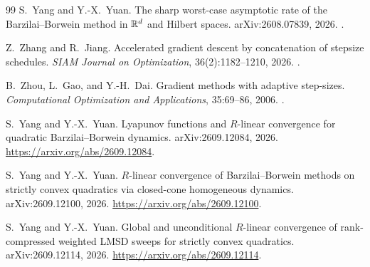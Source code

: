 \begin{thebibliography}{99}
S.~Yang and Y.-X.~Yuan.
The sharp worst-case asymptotic rate of the Barzilai--Borwein method in
$\mathbb R^d$ and Hilbert spaces.
arXiv:2608.07839, 2026.
.

Z.~Zhang and R.~Jiang.
Accelerated gradient descent by concatenation of stepsize schedules.
\emph{SIAM Journal on Optimization}, 36(2):1182--1210, 2026.
.

B.~Zhou, L.~Gao, and Y.-H.~Dai.
Gradient methods with adaptive step-sizes.
\emph{Computational Optimization and Applications}, 35:69--86, 2006.
.

S.~Yang and Y.-X.~Yuan.
Lyapunov functions and $R$-linear convergence for quadratic
Barzilai--Borwein dynamics.
arXiv:2609.12084, 2026.
\url{https://arxiv.org/abs/2609.12084}.

S.~Yang and Y.-X.~Yuan.
$R$-linear convergence of Barzilai--Borwein methods on strictly convex
quadratics via closed-cone homogeneous dynamics.
arXiv:2609.12100, 2026.
\url{https://arxiv.org/abs/2609.12100}.

S.~Yang and Y.-X.~Yuan.
Global and unconditional $R$-linear convergence of rank-compressed
weighted LMSD sweeps for strictly convex quadratics.
arXiv:2609.12114, 2026.
\url{https://arxiv.org/abs/2609.12114}.


\end{thebibliography}